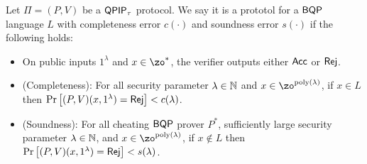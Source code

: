 \begin{definition}
	Let $\Pi=(P, V)$ be a $\operatorname{\mathsf{QPIP}}_\tau$ protocol.
	We say it is a prototol for a $\operatorname{\mathsf{BQP}}$ language $L$ with completeness error $c(\cdot)$ and soundness error $s(\cdot)$ if the following holds:
\begin{itemize}
		\item On public inputs $1^\lambda$ and $x\in\zo^*$, the verifier outputs either $\mathsf{Acc}$ or $\mathsf{Rej}$.
		\item (Completeness): For all security parameter $\lambda\in\mathbb{N}$ and $x\in\zo^{\poly(\lambda)}$, if $x\in L$ then
		$\Pr\left[(P, V)(x, 1^\lambda)=\mathsf{Rej}\right]<c(\lambda)$.
		\item (Soundness): For all cheating $\operatorname{\mathsf{BQP}}$ prover $P^*$, sufficiently large security parameter $\lambda\in\mathbb{N}$, and $x\in\zo^{\poly(\lambda)}$, if $x \notin L$ then $\Pr\left[(P, V)(x, 1^\lambda)=\mathsf{Rej}\right]<s(\lambda)$.
	\end{itemize}
\end{definition}

